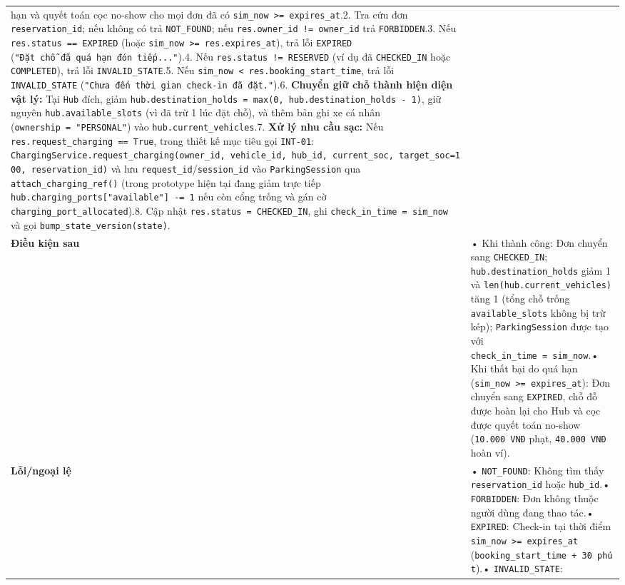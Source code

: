 \documentclass[11pt,a4paper]{article}
\begin{document}
\begin{longtable}[]{@{}
  >{\raggedright\arraybackslash}p{}
  >{\raggedright\arraybackslash}p{}@{}}
hạn và quyết toán cọc no-show cho mọi đơn đã có
\texttt{sim\_now\ \textgreater{}=\ expires\_at}.2. Tra cứu đơn
\texttt{reservation\_id}; nếu không có trả \texttt{NOT\_FOUND}; nếu
\texttt{res.owner\_id\ !=\ owner\_id} trả \texttt{FORBIDDEN}.3. Nếu
\texttt{res.status\ ==\ EXPIRED} (hoặc
\texttt{sim\_now\ \textgreater{}=\ res.expires\_at}), trả lỗi
\texttt{EXPIRED} (\texttt{"Đặt\ chỗ\ đã\ quá\ hạn\ đón\ tiếp..."}).4.
Nếu \texttt{res.status\ !=\ RESERVED} (ví dụ đã \texttt{CHECKED\_IN}
hoặc \texttt{COMPLETED}), trả lỗi \texttt{INVALID\_STATE}.5. Nếu
\texttt{sim\_now\ \textless{}\ res.booking\_start\_time}, trả lỗi
\texttt{INVALID\_STATE}
(\texttt{"Chưa\ đến\ thời\ gian\ check-in\ đã\ đặt."}).6. \textbf{Chuyển
giữ chỗ thành hiện diện vật lý:} Tại \texttt{Hub} đích, giảm
\texttt{hub.destination\_holds\ =\ max(0,\ hub.destination\_holds\ -\ 1)},
giữ nguyên \texttt{hub.available\_slots} (vì đã trừ 1 lúc đặt chỗ), và
thêm bản ghi xe cá nhân (\texttt{ownership\ =\ "PERSONAL"}) vào
\texttt{hub.current\_vehicles}.7. \textbf{Xử lý nhu cầu sạc:} Nếu
\texttt{res.request\_charging\ ==\ True}, trong thiết kế mục tiêu gọi
\texttt{INT-01}:
\texttt{ChargingService.request\_charging(owner\_id,\ vehicle\_id,\ hub\_id,\ current\_soc,\ target\_soc=100,\ reservation\_id)}
và lưu \texttt{request\_id}/\texttt{session\_id} vào
\texttt{ParkingSession} qua \texttt{attach\_charging\_ref()} (trong
prototype hiện tại đang giảm trực tiếp
\texttt{hub.charging\_ports{[}"available"{]}\ -=\ 1} nếu còn cổng trống
và gán cờ \texttt{charging\_port\_allocated}).8. Cập nhật
\texttt{res.status\ =\ CHECKED\_IN}, ghi
\texttt{check\_in\_time\ =\ sim\_now} và gọi
\texttt{bump\_state\_version(state)}. \\
\textbf{Điều kiện sau} & • Khi thành công: Đơn chuyển sang
\texttt{CHECKED\_IN}; \texttt{hub.destination\_holds} giảm 1 và
\texttt{len(hub.current\_vehicles)} tăng 1 (tổng chỗ trống
\texttt{available\_slots} không bị trừ kép); \texttt{ParkingSession}
được tạo với \texttt{check\_in\_time\ =\ sim\_now}.• Khi thất bại do quá
hạn (\texttt{sim\_now\ \textgreater{}=\ expires\_at}): Đơn chuyển sang
\texttt{EXPIRED}, chỗ đỗ được hoàn lại cho Hub và cọc được quyết toán
no-show (\texttt{10.000\ VNĐ} phạt, \texttt{40.000\ VNĐ} hoàn ví). \\
\textbf{Lỗi/ngoại lệ} & • \texttt{NOT\_FOUND}: Không tìm thấy
\texttt{reservation\_id} hoặc \texttt{hub\_id}.• \texttt{FORBIDDEN}: Đơn
không thuộc người dùng đang thao tác.• \texttt{EXPIRED}: Check-in tại
thời điểm \texttt{sim\_now\ \textgreater{}=\ expires\_at}
(\texttt{booking\_start\_time\ +\ 30\ phút}).• \texttt{INVALID\_STATE}:

\end{longtable}
\end{document}
